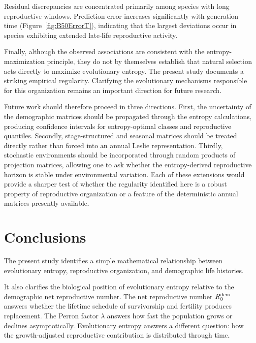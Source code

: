 \documentclass[10pt,a4paper]{amsart}
\theoremstyle{definition}
\theoremstyle{remark}
\numberwithin{equation}{section}
\begin{document}
Residual discrepancies are concentrated primarily among species with
long reproductive windows. Prediction error increases
significantly with generation time
(Figure~\ref{fig:B50ErrorT}),
indicating that the largest deviations occur in species exhibiting
extended late-life reproductive activity.

Finally, although the observed associations are consistent with the
entropy-maximization principle, they do not by themselves establish
that natural selection acts directly to maximize evolutionary
entropy. The present study documents a striking empirical
regularity. Clarifying the evolutionary mechanisms responsible for
this organization remains an important direction for future
research.

Future work should therefore proceed in three directions. First, the uncertainty of the demographic matrices should be propagated through the entropy calculations, producing confidence intervals for entropy-optimal classes and reproductive quantiles. Secondly, stage-structured and seasonal matrices should be treated directly rather than forced into an annual Leslie representation. Thirdly, stochastic environments should be incorporated through random products of projection matrices, allowing one to ask whether the entropy-derived reproductive horizon is stable under environmental variation. Each of these extensions would provide a sharper test of whether the regularity identified here is a robust property of reproductive organization or a feature of the deterministic annual matrices presently available.

\FloatBarrier

\section{Conclusions}

The present study identifies a simple mathematical relationship
between evolutionary entropy, reproductive organization, and
demographic life histories.

It also clarifies the biological position of evolutionary entropy relative to the demographic net reproductive number. The net reproductive number $R_0^{\rm dem}$ answers whether the lifetime schedule of survivorship and fertility produces replacement. The Perron factor $\lambda$ answers how fast the population grows or declines asymptotically. Evolutionary entropy answers a different question: how the growth-adjusted reproductive contribution is distributed through time.
\end{document}

